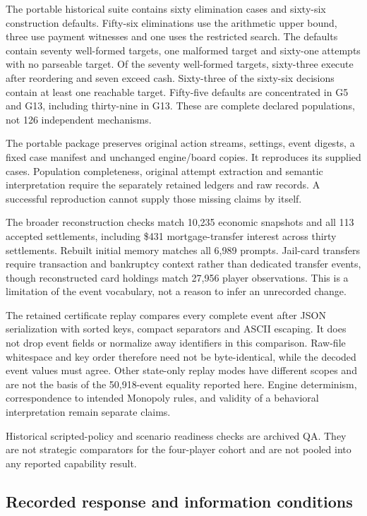 \label{app:validation}
The portable historical suite contains sixty elimination cases and sixty-six construction defaults. Fifty-six eliminations use the arithmetic upper bound, three use payment witnesses and one uses the restricted search. The defaults contain seventy well-formed targets, one malformed target and sixty-one attempts with no parseable target. Of the seventy well-formed targets, sixty-three execute after reordering and seven exceed cash. Sixty-three of the sixty-six decisions contain at least one reachable target. Fifty-five defaults are concentrated in G5 and G13, including thirty-nine in G13. These are complete declared populations, not 126 independent mechanisms.

The portable package preserves original action streams, settings, event digests, a fixed case manifest and unchanged engine/board copies. It reproduces its supplied cases. Population completeness, original attempt extraction and semantic interpretation require the separately retained ledgers and raw records. A successful reproduction cannot supply those missing claims by itself.

The broader reconstruction checks match 10,235 economic snapshots and all 113 accepted settlements, including \$431 mortgage-transfer interest across thirty settlements. Rebuilt initial memory matches all 6,989 prompts. Jail-card transfers require transaction and bankruptcy context rather than dedicated transfer events, though reconstructed card holdings match 27,956 player observations. This is a limitation of the event vocabulary, not a reason to infer an unrecorded change.

The retained certificate replay compares every complete event after JSON serialization with sorted keys, compact separators and ASCII escaping. It does not drop event fields or normalize away identifiers in this comparison. Raw-file whitespace and key order therefore need not be byte-identical, while the decoded event values must agree. Other state-only replay modes have different scopes and are not the basis of the 50,918-event equality reported here. Engine determinism, correspondence to intended Monopoly rules, and validity of a behavioral interpretation remain separate claims.

Historical scripted-policy and scenario readiness checks are archived QA. They are not strategic comparators for the four-player cohort and are not pooled into any reported capability result.

\subsection{Recorded response and information conditions}
\label{app:conditions}

